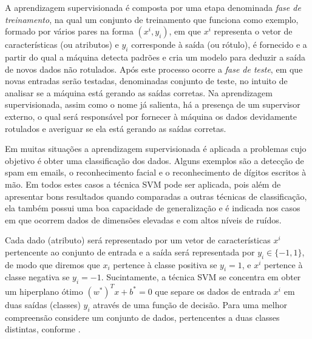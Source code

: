 \documentclass[12pt,a4paper]{scrartcl}
\theoremstyle{definition}%
\begin{document}
A aprendizagem supervisionada é composta por uma etapa denominada \emph{fase de treinamento}, na qual um conjunto de treinamento que funciona como exemplo, formado por vários pares na forma $(x^{i}, y_{i})$, em que $x^{i}$ representa o vetor de características (ou atributos) e $y_{i}$ corresponde à saída (ou rótulo), é fornecido e a partir do qual a máquina detecta padrões e cria um modelo para deduzir a saída de novos dados não rotulados. Após este processo ocorre a \emph{fase de teste}, em que novas entradas serão testadas, denominadas conjunto de teste, no intuito de analisar se a máquina está gerando as saídas corretas. Na aprendizagem supervisionada, assim como o nome já salienta, há a presença de um supervisor externo, o qual será responsável por fornecer à máquina os dados devidamente rotulados e averiguar se ela está gerando as saídas corretas.

Em muitas situações a aprendizagem supervisionada é aplicada a problemas cujo objetivo é obter uma classificação dos dados. Alguns exemplos são a detecção de spam em emails, o reconhecimento facial e o reconhecimento de dígitos escritos à mão. Em todos estes casos a técnica SVM pode ser aplicada, pois além de apresentar bons resultados quando comparadas a outras técnicas de classificação, ela também  possui uma boa capacidade de generalização e é indicada nos casos em que ocorrem dados de dimensões elevadas e com altos níveis de ruídos. 

Cada dado (atributo) será representado por um vetor de características $x^{i}$ pertencente ao conjunto de entrada e a saída será representada por $y_{i} \in \{ -1,1 \}$, de modo que diremos que $x_{i}$ pertence à classe positiva se $y_{i} = 1$, e $x^{i}$ pertence à classe negativa se $y_{i} = -1$. Sucintamente, a técnica SVM se concentra em obter um hiperplano ótimo $(w^{*})^{T}x + b^{*} = 0$ que separe os dados de entrada $x^{i}$ em duas saídas (classes) $y_{i}$ através de uma função de decisão. Para uma melhor compreensão considere um conjunto de dados, pertencentes a duas classes distintas, conforme .
\end{document}
